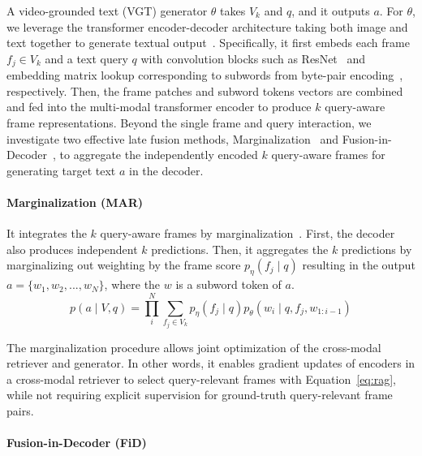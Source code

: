 \documentclass{article}
\begin{document}
A video-grounded text (VGT) generator $\theta$ takes $V_k$ and $q$, and it outputs $a$. For $\theta$, we leverage the transformer encoder-decoder architecture taking both image and text together to generate textual output~\cite{vaswani2017attention, wang2021simvlm, wang2022unifying}. Specifically, it first embeds each frame $f_j \in V_k$ and a text query $q$ with convolution blocks such as ResNet~\cite{he2016deep} and embedding matrix lookup corresponding to subwords from byte-pair encoding~\cite{sennrich2015neural}, respectively. Then, the frame patches and subword tokens vectors are combined and fed into the multi-modal transformer encoder to produce $k$ query-aware frame representations. Beyond the single frame and query interaction, we investigate two effective late fusion methods, Marginalization~\cite{lewis2020retrieval} and Fusion-in-Decoder~\cite{izacard2021leveraging}, to aggregate the independently encoded $k$ query-aware frames for generating target text $a$ in the decoder.


\paragraph{Marginalization (MAR)}

It integrates the $k$ query-aware frames by marginalization~\cite{lewis2020retrieval}. First, the decoder also produces independent $k$ predictions. Then, it aggregates the $k$ predictions by marginalizing out weighting by the frame score $p_{\eta}(f_j \mid q)$ resulting in the output $a = \{w_1, w_2, ..., w_N\}$, where the $w$ is a subword token of $a$.
\begin{equation}
    p(a \mid V, q) = \prod_i^N \sum_{f_j \in V_k} p_{\eta}(f_j \mid q) p_{\theta}(w_i \mid q, f_j, w_{1:i-1})
    \label{eq:rag}
\end{equation}

The marginalization procedure allows joint optimization of the cross-modal retriever and generator. In other words, it enables gradient updates of encoders in a cross-modal retriever to select query-relevant frames with Equation~\ref{eq:rag}, while not requiring explicit supervision for ground-truth query-relevant frame pairs.

\paragraph{Fusion-in-Decoder (FiD)}
\end{document}

